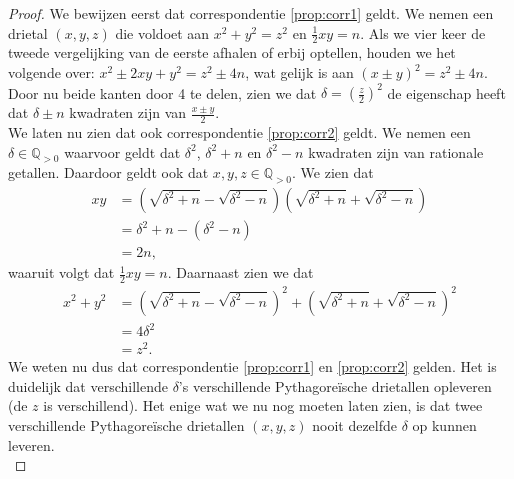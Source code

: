 \documentclass[12pt,reqno]{article}
\newcommand*{\QQ}{\ensuremath{\mathbb{Q}}}
\theoremstyle{theorem}
\theoremstyle{definition}
\begin{document}
	\begin{proof}
		We bewijzen eerst dat correspondentie \eqref{prop:corr1} geldt. We nemen een drietal $(x, y, z)$ die voldoet aan $x^2 + y^2 = z^2$ en $\frac{1}{2}xy=n$. Als we vier keer de tweede vergelijking van de eerste afhalen of erbij optellen, houden we het volgende over: $x^2 \pm 2xy + y^2 = z^2 \pm 4n$, wat gelijk is aan $(x \pm y)^2 = z^2 \pm 4n$. Door nu beide kanten door 4 te delen, zien we dat $\delta = (\frac{z}{2})^2$ de eigenschap heeft dat $\delta \pm n$ kwadraten zijn van $\frac{x \pm y}{2}$. \\
		 
		We laten nu zien dat ook correspondentie \eqref{prop:corr2} geldt. We nemen een $\delta\in\QQ_{>0}$ waarvoor geldt dat $\delta^2$, $\delta^2+n$ en $\delta^2-n$ kwadraten zijn van rationale getallen. Daardoor geldt ook dat $x, y, z \in\QQ_{>0}$. We zien dat
		\begin{align*}
			xy &= \left( \sqrt{\delta^2+n} - \sqrt{\delta^2-n} \right) \left( \sqrt{\delta^2+n} + \sqrt{\delta^2-n} \right) \\
			&= \delta^2+n - \left( \delta^2-n \right) \\
			&= 2n,
		\end{align*}
		 waaruit volgt dat $\frac{1}{2}xy = n$. Daarnaast zien we dat
		 \begin{align*}
			 x^2 + y^2 &= \left( \sqrt{\delta^2+n} - \sqrt{\delta^2-n} \right)^2 + \left( \sqrt{\delta^2+n} + \sqrt{\delta^2-n} \right)^2 \\
			 &= 4 \delta^2 \\
			 &= z^2.
		 \end{align*}
		 We weten nu dus dat correspondentie \eqref{prop:corr1} en \eqref{prop:corr2} gelden. Het is duidelijk dat verschillende $\delta$'s verschillende Pythagore\"ische drietallen opleveren (de $z$ is verschillend). Het enige wat we nu nog moeten laten zien, is dat twee verschillende Pythagore\"ische drietallen $(x,y,z)$ nooit dezelfde $\delta$ op kunnen leveren. \\
		 

\end{proof}
\end{document}
